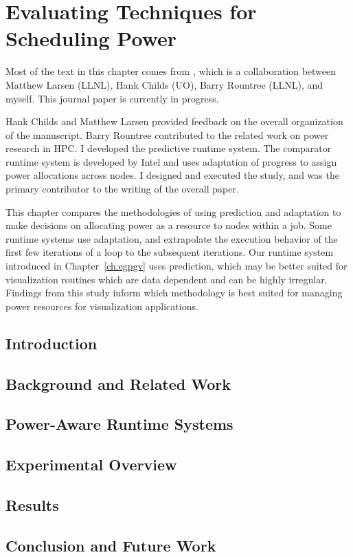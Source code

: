 \chapter{Evaluating Techniques for Scheduling Power}
\label{ch:tpds}

Most of the text in this chapter comes from \cite{paviz.journal.inprogress},
which is a collaboration between Matthew Larsen (LLNL), Hank Childs (UO), Barry
Rountree (LLNL), and myself.
%
This journal paper is currently in progress.

Hank Childs and Matthew Larsen provided feedback on the overall organization of
the manuscript.
%
Barry Rountree contributed to the related work on power research in HPC.
%
I developed the predictive runtime system.
%
The comparator runtime system is developed by Intel and uses adaptation of
progress to assign power allocations across nodes.
%
I designed and executed the study, and was the primary contributor to the
writing of the overall paper.

This chapter compares the methodologies of using prediction and adaptation to
make decisions on allocating power as a resource to nodes within a job.
%
Some runtime systems use adaptation, and extrapolate the execution behavior of
the first few iterations of a loop to the subsequent iterations.
%
Our runtime system introduced in Chapter~\ref{ch:egpgv} uses prediction, which
may be better suited for visualization routines which are data dependent and
can be highly irregular.
%
Findings from this study inform which methodology is best suited for
managing power resources for visualization applications.

\section{Introduction}


\section{Background and Related Work}
\label{sec:ch5-relwork}


\section{Power-Aware Runtime Systems}
\label{sec:ch5-runtimesys}


\section{Experimental Overview}
\label{sec:ch5-study}


\section{Results}
\label{sec:ch5-results}


\section{Conclusion and Future Work}
\label{sec:ch5-concl}

